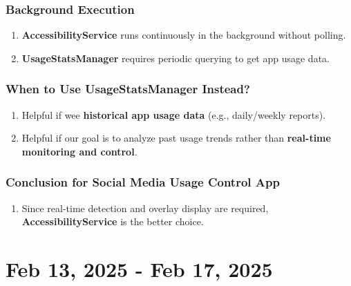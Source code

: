 \documentclass[12pt]{article}
\begin{document}
    \subsubsection{Background Execution}
    \begin{enumerate}
        \item \textbf{AccessibilityService} runs continuously in the background without polling.
        \item \textbf{UsageStatsManager} requires periodic querying to get app usage data.
    \end{enumerate}
    
    \subsubsection{When to Use UsageStatsManager Instead?}
    \begin{enumerate}
        \item Helpful if wee \textbf{historical app usage data} (e.g., daily/weekly reports).
        \item Helpful if our goal is to analyze past usage trends rather than \textbf{real-time monitoring and control}.
    \end{enumerate}
    
    \subsubsection{Conclusion for Social Media Usage Control App}
    \begin{enumerate}
        \item Since real-time detection and overlay display are required, \textbf{AccessibilityService} is the better choice.
    \end{enumerate}
    
    \section{Feb 13, 2025 - Feb 17, 2025}
\end{document}
